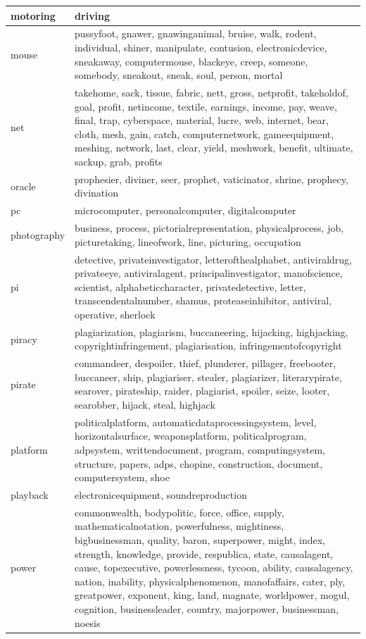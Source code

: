 \documentclass[12pt,a4paper]{report}
\begin{document}
\begin{table}[H]
\begin{center}
\begin{tabular}{|l|l|}
\hline
motoring & driving\\
\hline
mouse & pussyfoot, gnawer, gnawinganimal, bruise, walk, rodent, individual, shiner, manipulate, contusion, electronicdevice, sneakaway, computermouse, blackeye, creep, someone, somebody, sneakout, sneak, soul, person, mortal\\
\hline
net & takehome, sack, tissue, fabric, nett, gross, netprofit, takeholdof, goal, profit, netincome, textile, earnings, income, pay, weave, final, trap, cyberspace, material, lucre, web, internet, bear, cloth, mesh, gain, catch, computernetwork, gameequipment, meshing, network, last, clear, yield, meshwork, benefit, ultimate, sackup, grab, profits\\
\hline
oracle & prophesier, diviner, seer, prophet, vaticinator, shrine, prophecy, divination\\
\hline
pc & microcomputer, personalcomputer, digitalcomputer\\
\hline
photography & business, process, pictorialrepresentation, physicalprocess, job, picturetaking, lineofwork, line, picturing, occupation\\
\hline
pi & detective, privateinvestigator, letterofthealphabet, antiviraldrug, privateeye, antiviralagent, principalinvestigator, manofscience, scientist, alphabeticcharacter, privatedetective, letter, transcendentalnumber, shamus, proteaseinhibitor, antiviral, operative, sherlock\\
\hline
piracy & plagiarization, plagiarism, buccaneering, hijacking, highjacking, copyrightinfringement, plagiarisation, infringementofcopyright\\
\hline
pirate & commandeer, despoiler, thief, plunderer, pillager, freebooter, buccaneer, ship, plagiariser, stealer, plagiarizer, literarypirate, searover, pirateship, raider, plagiarist, spoiler, seize, looter, searobber, hijack, steal, highjack\\
\hline
platform & politicalplatform, automaticdataprocessingsystem, level, horizontalsurface, weaponsplatform, politicalprogram, adpsystem, writtendocument, program, computingsystem, structure, papers, adps, chopine, construction, document, computersystem, shoe\\
\hline
playback & electronicequipment, soundreproduction\\
\hline
power & commonwealth, bodypolitic, force, office, supply, mathematicalnotation, powerfulness, mightiness, bigbusinessman, quality, baron, superpower, might, index, strength, knowledge, provide, respublica, state, causalagent, cause, topexecutive, powerlessness, tycoon, ability, causalagency, nation, inability, physicalphenomenon, manofaffairs, cater, ply, greatpower, exponent, king, land, magnate, worldpower, mogul, cognition, businessleader, country, majorpower, businessman, noesis\\

\end{tabular}
\end{center}
\end{table}
\end{document}
